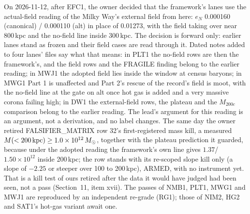 \documentclass[10pt]{article}
\begin{document}
\begin{itemize}
On 2026-11-12, after EFC1, the owner decided that the framework's lanes use the actual-field reading of the Milky Way's external field from here: $e_N$ 0.000160 (canonical) / 0.000110 (alt) in place of 0.01273, with the field taking over near 800\,kpc and the no-field line inside 300\,kpc. The decision is forward only: earlier lanes stand as frozen and their field cases are read through it. Dated notes added to four lanes' files say what that means: in PLT1 the no-field rows are then the framework's, and the field rows and the FRAGILE finding belong to the earlier reading; in MWJ1 the adopted field lies inside the window at census baryons; in MWG1 Part 1 is unaffected and Part 2's rescue of the record's field is moot, with the no-field line at the gate on alt once hot gas is added and a very massive corona failing high; in DW1 the external-field rows, the plateau and the $M_{200c}$ comparison belong to the earlier reading. The lead's argument for this reading is an argument, not a derivation, and no label changes. The same day the owner retired FALSIFIER\_MATRIX row 32's first-registered mass kill, a measured $M(<200\,{\rm kpc})\ge1.0\times10^{12}\,M_\odot$, together with the plateau prediction it guarded, because under the adopted reading the framework's own line gives $1.37$/$1.50\times10^{12}$ inside 200\,kpc; the row stands with its re-scoped slope kill only (a slope of $-2.25$ or steeper over 100 to 200\,kpc), ARMED, with no instrument yet. That is a kill test of ours retired after the data it would have judged had been seen, not a pass (Section~11, item xvii). The passes of NMB1, PLT1, MWG1 and MWJ1 are reproduced by an independent re-grade (RG1); those of NIM2, HG2 and SAT1's hot-gas variant await one.

\end{itemize}
\end{document}
